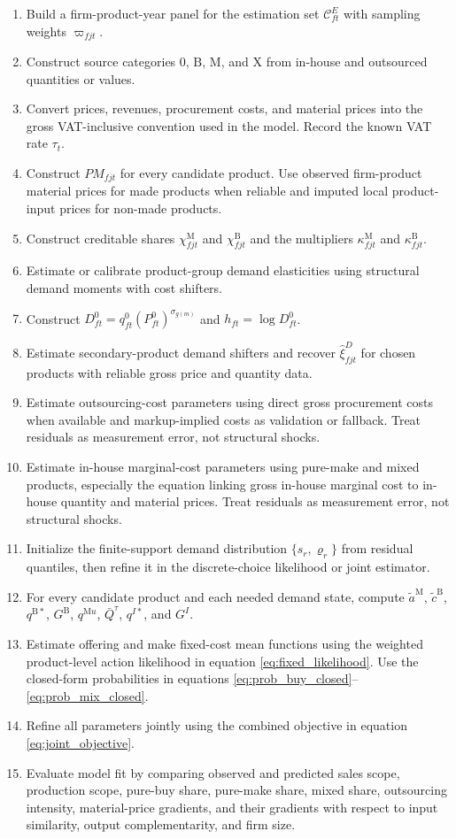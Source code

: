 \documentclass[11pt,a4paper]{article}
\newcommand{\mc}{\mathcal}
\newcommand{\M}{\mathrm{M}}
\newcommand{\B}{\mathrm{B}}
\newcommand{\X}{\mathrm{X}}
\begin{document}
\begin{enumerate}
    \item Build a firm-product-year panel for the estimation set $\mc{C}^{E}_{ft}$ with sampling weights $\varpi_{fjt}$.
    \item Construct source categories $0$, $\B$, $\M$, and $\X$ from in-house and outsourced quantities or values.
    \item Convert prices, revenues, procurement costs, and material prices into the gross VAT-inclusive convention used in the model. Record the known VAT rate $\tau_t$.
    \item Construct $PM_{fjt}$ for every candidate product. Use observed firm-product material prices for made products when reliable and imputed local product-input prices for non-made products.
    \item Construct creditable shares $\chi^{\M}_{fjt}$ and $\chi^{\B}_{fjt}$ and the multipliers $\kappa^{\M}_{fjt}$ and $\kappa^{\B}_{fjt}$.
    \item Estimate or calibrate product-group demand elasticities using structural demand moments with cost shifters.
    \item Construct $D^0_{ft}=q^0_{ft}(P^0_{ft})^{\sigma_{g(m)}}$ and $h_{ft}=\log D^0_{ft}$.
    \item Estimate secondary-product demand shifters and recover $\widehat\xi^D_{fjt}$ for chosen products with reliable gross price and quantity data.
    \item Estimate outsourcing-cost parameters using direct gross procurement costs when available and markup-implied costs as validation or fallback. Treat residuals as measurement error, not structural shocks.
    \item Estimate in-house marginal-cost parameters using pure-make and mixed products, especially the equation linking gross in-house marginal cost to in-house quantity and material prices. Treat residuals as measurement error, not structural shocks.
    \item Initialize the finite-support demand distribution $\{s_r,\varrho_r\}$ from residual quantiles, then refine it in the discrete-choice likelihood or joint estimator.
    \item For every candidate product and each needed demand state, compute $\widetilde a^{\M}$, $\widetilde c^{\B}$, $q^{\B*}$, $G^{\B}$, $q^{\M u}$, $\bar Q^{\tau}$, $q^{I*}$, and $G^I$.
    \item Estimate offering and make fixed-cost mean functions using the weighted product-level action likelihood in equation \eqref{eq:fixed_likelihood}. Use the closed-form probabilities in equations \eqref{eq:prob_buy_closed}--\eqref{eq:prob_mix_closed}.
    \item Refine all parameters jointly using the combined objective in equation \eqref{eq:joint_objective}.
    \item Evaluate model fit by comparing observed and predicted sales scope, production scope, pure-buy share, pure-make share, mixed share, outsourcing intensity, material-price gradients, and their gradients with respect to input similarity, output complementarity, and firm size.
\end{enumerate}
\end{document}
